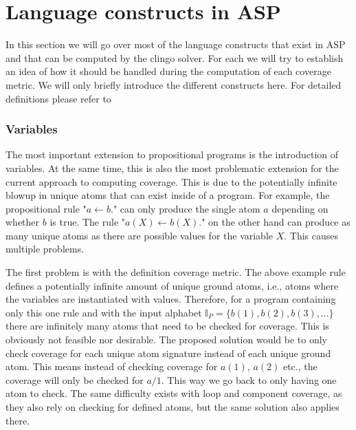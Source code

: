 \begin{comment}
- the given definitions of the coverage metrics are only for propositional programs but this is not very practical as most programs 
are more complex than that. They contain many complex language constructs supported by ASP/clingo

-> to make this coverage check actually usable these metrics have to be extended to work for all these constructs

- in general, the label approach should allow me to easily apply these coverage metrics to further program classes with very little 
adjustments!
\end{comment}

\section{Language constructs in ASP}
\label{sec:Coverage for further program classes/Language constructs}
In this section we will go over most of the language constructs that exist in ASP and that can be computed by the clingo solver. For each we will try to establish an idea of how it should be handled during the computation of each coverage metric. We will only briefly introduce the different constructs here. For detailed definitions please refer to \textcite{Geb+19, Geb+15}

\subsubsection{Variables}
\label{subsubsec:Coverage for further program classes/Language constructs/Variables}
The most important extension to propositional programs is the introduction of variables. At the same time, this is also the most problematic extension for the current approach to computing coverage. This is due to the potentially infinite blowup in unique atoms that can exist inside of a program. For example, the propositional rule "\(a \leftarrow b.\)" can only produce the single atom $a$ depending on whether $b$ is true. The rule "\(a(X) \leftarrow b(X).\)" on the other hand can produce as many unique atoms as there are possible values for the variable $X$. This causes multiple problems.

The first problem is with the definition coverage metric. The above example rule defines a potentially infinite amount of unique ground atoms, i.e., atoms where the variables are instantiated with values. Therefore, for a program containing only this one rule and with the input alphabet \(\mathbb{I}_P = \{b(1), b(2), b(3), \ldots\}\) there are infinitely many atoms that need to be checked for coverage. This is obviously not feasible nor desirable. The proposed solution would be to only check coverage for each unique atom signature instead of each unique ground atom. This means instead of checking coverage for $a(1)$, $a(2)$ etc., the coverage will only be checked for $a/1$. This way we go back to only having one atom to check. The same difficulty exists with loop and component coverage, as they also rely on checking for defined atoms, but the same solution also applies there.

